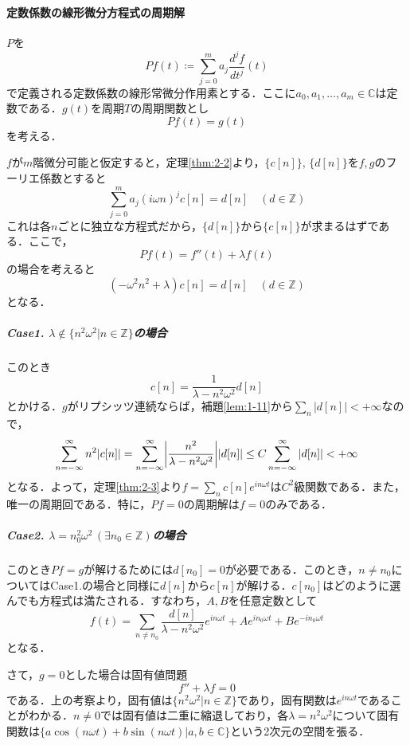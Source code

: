 \documentclass[dvipdfmx,a4j,10pt]{jsarticle}
\theoremstyle{mystyle1}
\theoremstyle{mystyle3}
\theoremstyle{mystyle4}
\theoremstyle{mystyle2}
\begin{document}
\paragraph{定数係数の線形微分方程式の周期解}

$P$を
\[
    Pf(t)\coloneqq\sum_{j=0}^m a_j\frac{d^j f}{dt^j}(t)
\]
で定義される定数係数の線形常微分作用素とする．ここに$a_0,a_1,\ldots,a_m\in\mathbb{C}$は定数である．$g(t)$を周期$T$の周期関数とし
\[
    Pf(t)=g(t)
\]
を考える．

$f$が$m$階微分可能と仮定すると，定理\ref{thm:2-2}より，$\{c[n]\},\,\{d[n]\}$を$f,g$のフーリエ係数とすると
\[
    \sum_{j=0}^m a_j(i\omega n)^j c[n]=d[n]\quad(d\in\mathbb{Z})
\]
これは各$n$ごとに独立な方程式だから，$\{d[n]\}$から$\{c[n]\}$が求まるはずである．ここで，
\[
    Pf(t)=f''(t)+\lambda f(t)
\]
の場合を考えると
\[
    (-\omega^2 n^2+\lambda)c[n]=d[n]\quad(d\in\mathbb{Z})
\]
となる．

\subparagraph{Case1. $\lambda\notin\{n^2\omega^2|n\in\mathbb{Z}\}$の場合}

このとき
\[
    c[n]=\frac{1}{\lambda-n^2\omega^2}d[n]
\]
とかける．$g$がリプシッツ連続ならば，補題\ref{lem:1-11}から$\sum_n |d[n]|<+\infty$なので，
\[
    \sum_{n=-\infty}^\infty n^2|c[n]|=\sum_{n=-\infty}^\infty\mleft|\frac{n^2}{\lambda-n^2\omega^2}\mright||d[n]|\leq C\sum_{n=-\infty}^\infty|d[n]|<+\infty
\]
となる．よって，定理\ref{thm:2-3}より$f=\sum_n c[n]e^{in\omega t}$は$C^2$級関数である．また，唯一の周期回である．特に，$Pf=0$の周期解は$f=0$のみである．

\subparagraph{Case2. $\lambda=n_0^2\omega^2\,(\exists n_0\in\mathbb{Z})$の場合}

このとき$Pf=g$が解けるためには$d[n_0]=0$が必要である．このとき，$n\neq n_0$についてはCase1.の場合と同様に$d[n]$から$c[n]$が解ける．$c[n_0]$はどのように選んでも方程式は満たされる．すなわち，$A,B$を任意定数として
\[
    f(t)=\sum_{n\neq n_0}\frac{d[n]}{\lambda-n^2\omega^2}e^{in\omega t}+Ae^{in_0\omega t}+Be^{-in_0\omega t}
\]
となる．

さて，$g=0$とした場合は固有値問題
\[
    f''+\lambda f=0
\]
である．上の考察より，固有値は$\{n^2\omega^2 | n\in\mathbb{Z}\}$であり，固有関数は$e^{in\omega t}$であることがわかる．$n\neq 0$では固有値は二重に縮退しており，各$\lambda=n^2\omega^2$について固有関数は$\{a\cos(n\omega t)+b\sin(n\omega t)|a,b\in\mathbb{C}\}$という2次元の空間を張る．
\end{document}
